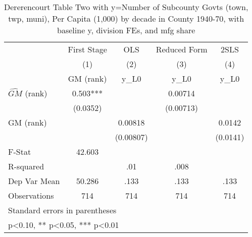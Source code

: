 \begin{table}[htbp]\centering
\def\sym#1{\ifmmode^{#1}\else\(^{#1}\)\fi}
\caption{Dererencourt Table Two with y=Number of Subcounty Govts (town, twp, muni), Per Capita (1,000) by decade in County 1940-70, with baseline y, division FEs, and mfg share}
\begin{tabular}{l*{4}{c}}
\toprule
                    & First Stage   &         OLS   &Reduced Form   &        2SLS   \\
                    &\multicolumn{1}{c}{(1)}&\multicolumn{1}{c}{(2)}&\multicolumn{1}{c}{(3)}&\multicolumn{1}{c}{(4)}\\
                    &\multicolumn{1}{c}{GM  (rank)}&\multicolumn{1}{c}{y\_L0}&\multicolumn{1}{c}{y\_L0}&\multicolumn{1}{c}{y\_L0}\\
\midrule
$\hat{GM}$ (rank)   &       0.503***&               &     0.00714   &               \\
                    &    (0.0352)   &               &   (0.00713)   &               \\
\addlinespace
GM  (rank)          &               &     0.00818   &               &      0.0142   \\
                    &               &   (0.00807)   &               &    (0.0141)   \\
\midrule
F-Stat              &      42.603   &               &               &               \\
R-squared           &               &         .01   &        .008   &               \\
Dep Var Mean        &      50.286   &        .133   &        .133   &        .133   \\
Observations        &         714   &         714   &         714   &         714   \\
\bottomrule
\multicolumn{5}{l}{\footnotesize Standard errors in parentheses}\\
\multicolumn{5}{l}{\footnotesize * p<0.10, ** p<0.05, *** p<0.01}\\
\end{tabular}
\end{table}
